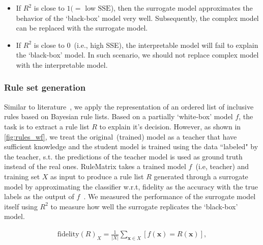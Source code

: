 \begin{itemize}[noitemsep]
    \item If $R^2$ is close to $1(=$ low $\mathrm{SSE}$), then the surrogate model approximates the behavior of the `black-box' model very well. Subsequently, the complex model can be replaced with the surrogate model. 
    \item If $R^2$ is close to 0~(i.e., high SSE), the interpretable model will fail to explain the `black-box' model. In such scenario, we should not replace  complex model with the interpretable model.
\end{itemize}

\subsubsection{Rule set generation}
Similar to literature~\cite{ming2018rulematrix}, we apply the representation of an ordered list of inclusive rules based on Bayesian rule lists. Based on a partially `white-box' model ${f}$, the task is to extract a rule list $R$ to explain it's decision. However, as shown in \cref{fig:rules_wf}, we treat the original~(trained) model as a teacher that have sufficient knowledge and the student model is trained using the data ``labeled" by the teacher, s.t. the predictions of the teacher model is used as ground truth instead of the real ones. RuleMatrix takes a trained model ${f}$~(i.e, teacher) and training set $X$ as input to produce a rule list $R$ generated through a surrogate model by approximating the classifier  w.r.t, fidelity as the accuracy with the true labels as the output of ${f}$~\cite{ming2018rulematrix}. We measured the performance of the surrogate model itself using $R^2$ to measure how well the surrogate replicates the `black-box' model.    

\vspace{-6mm}
\begin{align}
    \text {fidelity}(R)_{{X}}=\frac{1}{|{X}|} \sum_{\boldsymbol{x} \in {X}}[f(\boldsymbol{x})=R(\boldsymbol{x})],
    \label{eq:fidelity}
\end{align}

